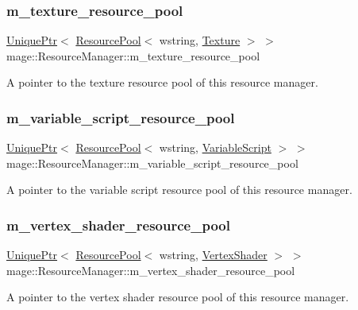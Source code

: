 \subsubsection{\texorpdfstring{m\+\_\+texture\+\_\+resource\+\_\+pool}{m\_texture\_resource\_pool}}
{\footnotesize\ttfamily \hyperlink{namespacemage_a8c307fbcc33bce9b7f2aa4c26c3b95cf}{Unique\+Ptr}$<$ \hyperlink{classmage_1_1_resource_pool}{Resource\+Pool}$<$ wstring, \hyperlink{classmage_1_1_texture}{Texture} $>$ $>$ mage\+::\+Resource\+Manager\+::m\+\_\+texture\+\_\+resource\+\_\+pool\hspace{0.3cm}{\ttfamily [private]}}

A pointer to the texture resource pool of this resource manager. \hypertarget{classmage_1_1_resource_manager_adc36ebb3e2d04fddc3a23e2f1303dbfe}{}\label{classmage_1_1_resource_manager_adc36ebb3e2d04fddc3a23e2f1303dbfe} 
\subsubsection{\texorpdfstring{m\+\_\+variable\+\_\+script\+\_\+resource\+\_\+pool}{m\_variable\_script\_resource\_pool}}
{\footnotesize\ttfamily \hyperlink{namespacemage_a8c307fbcc33bce9b7f2aa4c26c3b95cf}{Unique\+Ptr}$<$ \hyperlink{classmage_1_1_resource_pool}{Resource\+Pool}$<$ wstring, \hyperlink{classmage_1_1_variable_script}{Variable\+Script} $>$ $>$ mage\+::\+Resource\+Manager\+::m\+\_\+variable\+\_\+script\+\_\+resource\+\_\+pool\hspace{0.3cm}{\ttfamily [private]}}

A pointer to the variable script resource pool of this resource manager. \hypertarget{classmage_1_1_resource_manager_aee4af101fb42e8524121f18c16c76931}{}\label{classmage_1_1_resource_manager_aee4af101fb42e8524121f18c16c76931} 
\subsubsection{\texorpdfstring{m\+\_\+vertex\+\_\+shader\+\_\+resource\+\_\+pool}{m\_vertex\_shader\_resource\_pool}}
{\footnotesize\ttfamily \hyperlink{namespacemage_a8c307fbcc33bce9b7f2aa4c26c3b95cf}{Unique\+Ptr}$<$ \hyperlink{classmage_1_1_resource_pool}{Resource\+Pool}$<$ wstring, \hyperlink{classmage_1_1_vertex_shader}{Vertex\+Shader} $>$ $>$ mage\+::\+Resource\+Manager\+::m\+\_\+vertex\+\_\+shader\+\_\+resource\+\_\+pool\hspace{0.3cm}{\ttfamily [private]}}

A pointer to the vertex shader resource pool of this resource manager. 